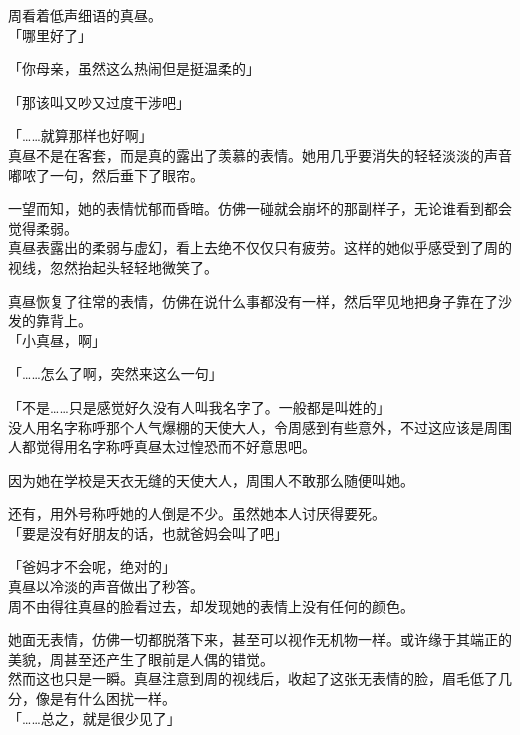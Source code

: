 周看着低声细语的真昼。\\

「哪里好了」

「你母亲，虽然这么热闹但是挺温柔的」

「那该叫又吵又过度干涉吧」

「……就算那样也好啊」\\

真昼不是在客套，而是真的露出了羡慕的表情。她用几乎要消失的轻轻淡淡的声音嘟哝了一句，然后垂下了眼帘。

一望而知，她的表情忧郁而昏暗。仿佛一碰就会崩坏的那副样子，无论谁看到都会觉得柔弱。\\

真昼表露出的柔弱与虚幻，看上去绝不仅仅只有疲劳。这样的她似乎感受到了周的视线，忽然抬起头轻轻地微笑了。%

真昼恢复了往常的表情，仿佛在说什么事都没有一样，然后罕见地把身子靠在了沙发的靠背上。\\

「小真昼，啊」

「……怎么了啊，突然来这么一句」

「不是……只是感觉好久没有人叫我名字了。一般都是叫姓的」\\

没人用名字称呼那个人气爆棚的天使大人，令周感到有些意外，不过这应该是周围人都觉得用名字称呼真昼太过惶恐而不好意思吧。

因为她在学校是天衣无缝的天使大人，周围人不敢那么随便叫她。

还有，用外号称呼她的人倒是不少。虽然她本人讨厌得要死。\\

「要是没有好朋友的话，也就爸妈会叫了吧」

「爸妈才不会呢，绝对的」\\

真昼以冷淡的声音做出了秒答。\\

周不由得往真昼的脸看过去，却发现她的表情上没有任何的颜色。

她面无表情，仿佛一切都脱落下来，甚至可以视作无机物一样。或许缘于其端正的美貌，周甚至还产生了眼前是人偶的错觉。\\

然而这也只是一瞬。真昼注意到周的视线后，收起了这张无表情的脸，眉毛低了几分，像是有什么困扰一样。\\

「……总之，就是很少见了」\\

